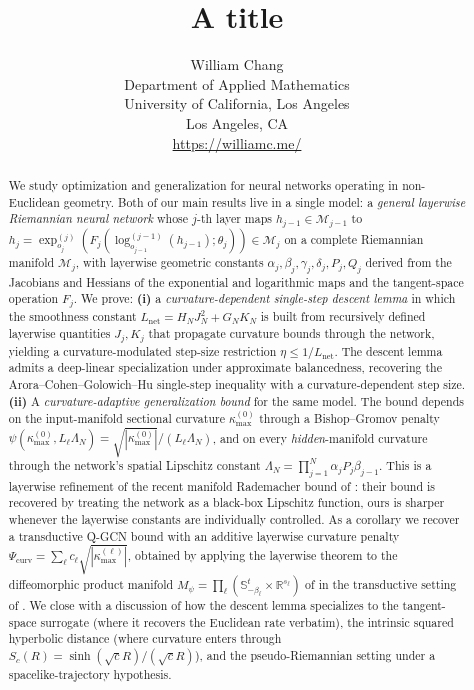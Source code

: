 \documentclass[letterpaper]{article}
\title{A title}
\author{William Chang\\
Department of Applied Mathematics\\
University of California, Los Angeles\\
Los Angeles, CA\\
\url{https://williamc.me/}\\
}
\newcommand{\R}{\mathbb{R}}
\begin{document}
\maketitle
\begin{abstract}
We study optimization and generalization for neural networks operating in
non-Euclidean geometry. Both of our main results live in a single model:
a \emph{general layerwise Riemannian neural network} whose $j$-th layer
maps $h_{j-1}\in\mathcal M_{j-1}$ to
$h_j = \exp_{o_j}^{(j)}(F_j(\log_{o_{j-1}}^{(j-1)}(h_{j-1});\theta_j))
\in\mathcal M_j$ on a complete Riemannian manifold $\mathcal M_j$, with
layerwise geometric constants
$\alpha_j,\beta_j,\gamma_j,\delta_j,P_j,Q_j$ derived from the Jacobians
and Hessians of the exponential and logarithmic maps and the tangent-space
operation $F_j$. We prove: \textbf{(i)} a \emph{curvature-dependent
single-step descent lemma} in which the smoothness constant
$L_{\mathrm{net}} = H_N J_N^2 + G_N K_N$ is built from recursively
defined layerwise quantities $J_j, K_j$ that propagate curvature bounds
through the network, yielding a curvature-modulated step-size restriction
$\eta\le 1/L_{\mathrm{net}}$. The descent lemma admits a deep-linear
specialization under approximate balancedness, recovering the
Arora--Cohen--Golowich--Hu \cite{arora2018convergence} single-step
inequality with a curvature-dependent step size. \textbf{(ii)} A
\emph{curvature-adaptive generalization bound} for the same model. The
bound depends on the input-manifold sectional curvature
$\kappa_{\max}^{(0)}$ through a Bishop--Gromov penalty
$\psi(\kappa_{\max}^{(0)}, L_\ell\Lambda_N) = \sqrt{|\kappa_{\max}^{(0)}|}/(L_\ell\Lambda_N)$,
and on every \emph{hidden}-manifold curvature through the network's
spatial Lipschitz constant
$\Lambda_N = \prod_{j=1}^N \alpha_j P_j \beta_{j-1}$. This is a layerwise
refinement of the recent manifold Rademacher bound of
\cite{sarkar2025learning}: their bound is recovered by treating the
network as a black-box Lipschitz function, ours is sharper whenever the
layerwise constants are individually controlled. As a corollary we
recover a transductive Q-GCN bound with an additive layerwise curvature
penalty $\Psi_{\mathrm{curv}} = \sum_\ell c_\ell \sqrt{|\kappa^{(\ell)}_{\max}|}$,
obtained by applying the layerwise theorem to the diffeomorphic product
manifold $M_\psi = \prod_\ell(\mathbb S^t_{-\beta_\ell}\times\R^{s_\ell})$
of \cite{xiong2022pseudo} in the transductive setting of
\cite{tang2023towards}. We close with a discussion of how the descent
lemma specializes to the tangent-space surrogate (where it recovers the
Euclidean rate verbatim), the intrinsic squared hyperbolic distance
(where curvature enters through $S_c(R) = \sinh(\sqrt c R)/(\sqrt c R)$),
and the pseudo-Riemannian setting under a spacelike-trajectory hypothesis.
\end{abstract}
\end{document}
